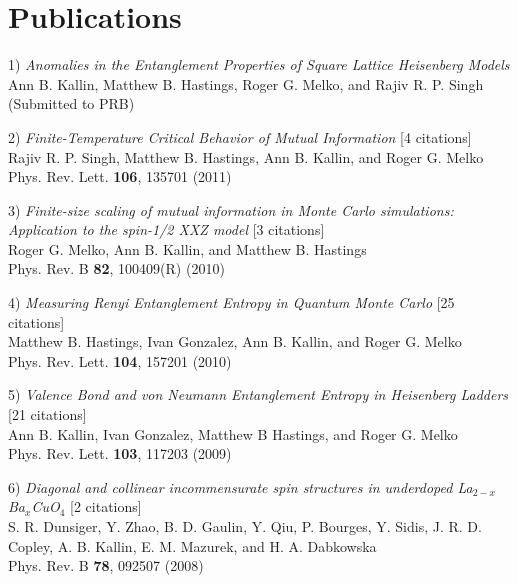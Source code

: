 \documentclass[letterpaper]{article}
\renewenvironment{itemize}{
  \begin{list}{}{
    \setlength{\leftmargin}{1.5em}
  }
}{
  \end{list}
}
\begin{document}
\section*{Publications}


\begin{itemize}

\item 1) {\it Anomalies in the Entanglement Properties of Square Lattice Heisenberg Models} \\
Ann B. Kallin, Matthew B. Hastings, Roger G. Melko, and Rajiv R. P. Singh \\
(Submitted to PRB) 

\item 2) {\it Finite-Temperature Critical Behavior of Mutual Information} [4 citations]\\
Rajiv R. P. Singh, Matthew B. Hastings, Ann B. Kallin, and Roger G. Melko\\ 
Phys. Rev. Lett. {\bf 106}, 135701 (2011)

\item 3) {\it Finite-size scaling of mutual information in Monte Carlo simulations: Application to the spin-1/2 XXZ model} [3 citations] \\
Roger G. Melko, Ann B. Kallin, and Matthew B. Hastings  \\
Phys. Rev. B {\bf 82}, 100409(R) (2010) 

\item 4) {\it Measuring Renyi Entanglement Entropy in Quantum Monte Carlo} [25 citations]\\
Matthew B. Hastings, Ivan Gonzalez, Ann B. Kallin, and Roger G. Melko \\
Phys. Rev. Lett. {\bf 104}, 157201 (2010) 

\item 5) {\it Valence Bond and von Neumann Entanglement Entropy in Heisenberg Ladders} [21 citations] \\
Ann B. Kallin, Ivan Gonzalez, Matthew B Hastings, and Roger G. Melko\\
Phys. Rev. Lett. {\bf 103}, 117203 (2009)

\item 6) {\it Diagonal and collinear incommensurate spin structures in underdoped La$_{2-x}$Ba$_x$CuO$_4$} [2 citations]\\
    S. R. Dunsiger, Y. Zhao, B. D. Gaulin, Y. Qiu, P. Bourges, Y. Sidis, J. R. D. Copley,  
  A. B. Kallin, E. M. Mazurek, and H. A. Dabkowska \\
Phys. Rev. B {\bf 78}, 092507 (2008) 
\end{itemize}
\end{document}
